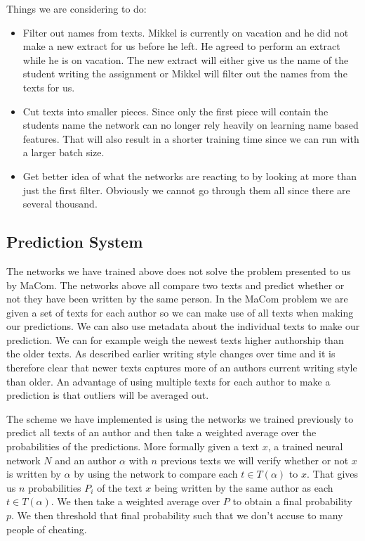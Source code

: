 Things we are considering to do:
\begin{itemize}
    \item Filter out names from texts. Mikkel is currently on vacation and he
        did not make a new extract for us before he left. He agreed to perform
        an extract while he is on vacation. The new extract will either give us
        the name of the student writing the assignment or Mikkel will filter out
        the names from the texts for us.
    \item Cut texts into smaller pieces. Since only the first piece will contain
        the students name the network can no longer rely heavily on learning
        name based features. That will also result in a shorter training time
        since we can run with a larger batch size.
    \item Get better idea of what the networks are reacting to by looking at
        more than just the first filter. Obviously we cannot go through them all
        since there are several thousand.
\end{itemize}


\subsection{Prediction System}

The networks we have trained above does not solve the problem presented to us
by MaCom. The networks above all compare two texts and predict whether or not
they have been written by the same person. In the MaCom problem we are given a
set of texts for each author so we can make use of all texts when making our
predictions. We can also use metadata about the individual texts to make our
prediction. We can for example weigh the newest texts higher authorship than
the older texts. As described earlier writing style changes over time and it is
therefore clear that newer texts captures more of an authors current writing
style than older. An advantage of using multiple texts for each author to make a
prediction is that outliers will be averaged out.

The scheme we have implemented is using the networks we trained previously
to predict all texts of an author and then take a weighted average over the
probabilities of the predictions. More formally given a text $x$, a trained
neural network $N$ and an author $\alpha$ with $n$ previous texts we will verify
whether or not $x$ is written by $\alpha$ by using the network to compare each
$t \in T(\alpha)$ to $x$. That gives us $n$ probabilities $P_i$ of the text
$x$ being written by the same author as each $t \in T(\alpha)$. We then take a
weighted average over $P$ to obtain a final probability $p$. We then threshold
that final probability such that we don't accuse to many people of cheating.

